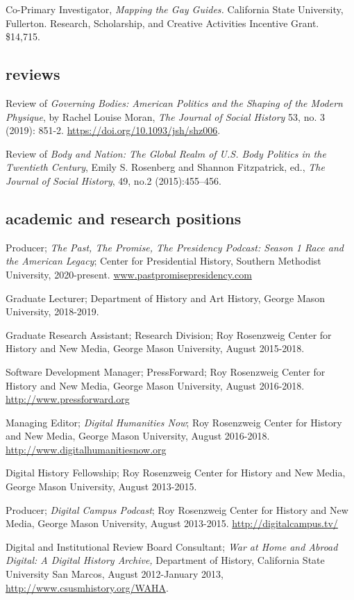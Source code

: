 \documentclass[11pt]{article}
\begin{document}
Co-Primary Investigator, \emph{Mapping the Gay Guides.} California State University, Fullerton. Research, Scholarship, and Creative Activities Incentive Grant. \$14,715.

\subsection{reviews}\label{reviews}

Review of \emph{Governing Bodies: American Politics and the Shaping of the Modern Physique}, by Rachel Louise Moran, \emph{The Journal of Social History} 53, no. 3 (2019): 851-2. \url{https://doi.org/10.1093/jsh/shz006}.

Review of \emph{Body and Nation: The Global Realm of U.S. Body Politics in the Twentieth Century}, Emily S. Rosenberg and Shannon Fitzpatrick, ed., \emph{The Journal of Social History}, 49, no.2 (2015):455–456.

\subsection{academic and research positions}
Producer; \emph{The Past, The Promise, The Presidency Podcast: Season 1 Race and the American Legacy}; Center for Presidential History, Southern Methodist University, 2020-present. \url{www.pastpromisepresidency.com}

Graduate Lecturer; Department of History and Art History, George Mason University, 2018-2019.

Graduate Research Assistant; Research Division; Roy Rosenzweig Center for History and New Media, George Mason University, August 2015-2018.

Software Development Manager; PressForward; Roy Rosenzweig Center for History and New Media, George Mason University, August 2016-2018. \url{http://www.pressforward.org}

Managing Editor; \emph{Digital Humanities Now}; Roy Rosenzweig Center for History and New Media, George Mason University, August 2016-2018. \url{http://www.digitalhumanitiesnow.org}

Digital History Fellowship; Roy Rosenzweig Center for History and New Media, George Mason University, August 2013-2015.

Producer; \emph{Digital Campus Podcast}; Roy Rosenzweig Center for History and New Media, George Mason University, August 2013-2015. \url{http://digitalcampus.tv/}

Digital and Institutional Review Board Consultant; \emph{War at Home and Abroad Digital: A Digital History Archive,} Department of History, California State University San Marcos, August 2012-January 2013, \url{http://www.csusmhistory.org/WAHA}.
\end{document}
